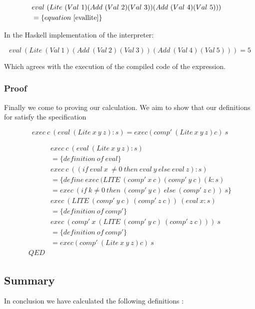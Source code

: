 \documentclass {article}
\begin{document}
\begin{align*}
&eval\ (Lite\ (Val\ 1) 
		(Add\ (Val\ 2) (Val\ 3)) 
		(Add\ (Val\ 4) (Val\ 5))) \\
&= \{ equation\ \ref{evallite} \}
&
\end{align*}

In the Haskell implementation of the
interpreter:

\[ eval\ (Lite\ (Val\ 1) (Add\ (Val\ 2) (Val\ 3)) (Add\ (Val\ 4) (Val\ 5)))  = 5\]


Which agrees with the execution of the 
compiled code of the expression.

\subsubsection{Proof}

Finally we come to proving our calculation.
We aim to show that our definitions for \lite
satisfy the specification

\[ exec\ c\ (eval\ (Lite\ x\ y\ z):s) = exec (comp'\ (Lite\ x\ y\ z) c)\ s  \]

\begin{align*}
&exec\ c\ (eval\ (Lite\ x\ y\ z):s) \\
&= \{ definition\ of\ eval \} \\
&exec\ c\ ((if\ eval\ x\ \not= 0\ then\ eval\ y\ else\ eval\ z) :s) \\
&= \{ define\: exec\ (LITE\ (comp'\ x\ c) (comp'\ y\ c) (k : s) \\
&= exec\ (if\ k \not=0\ then\ (comp'\ y\ c)\ else\ (comp'\ z\ c))\ s \} \\
& exec\ (LITE\ (comp'\ y\ c)\ (comp'\ z\ c))\ (eval\ x : s) \\
&= \{ definition\ of\ comp' \} \\
& exec\ (comp'\ x\ (LITE\ (comp'\ y\ c)\ (comp'\ z\ c)))\ s \\
&= \{definition\ of\ comp' \} \\
&= exec (comp'\ (Lite\ x\ y\ z) c)\ s \\
QED
\end{align*}

\subsection{Summary}

In conclusion we have calculated the following definitions
												\cite[page 11]{bandh}:
\end{document}
